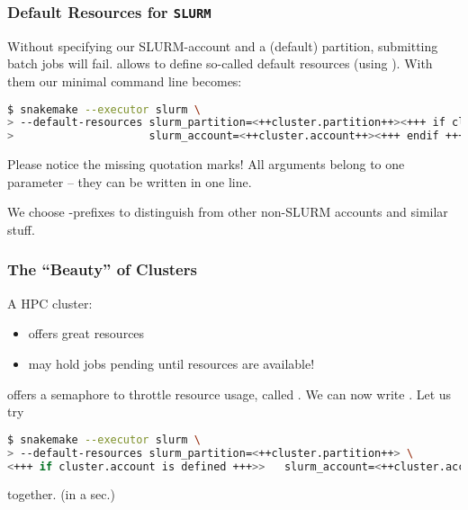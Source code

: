 \begin{frame}[fragile]
  \frametitle{Default Resources for \texttt{SLURM}}
  Without specifying our SLURM-account and a (default) partition, submitting batch jobs will fail. \Snakemake{} allows to define so-called default resources (using ). With them our minimal command line becomes:
  \begin{lstlisting}[language=Bash, style=Shell, basicstyle=\footnotesize]
$ snakemake --executor slurm \
> --default-resources slurm_partition=<++cluster.partition++><+++ if cluster.account is defined +++> \
>                     slurm_account=<++cluster.account++><+++ endif +++>                      
  \end{lstlisting}
  \begin{hint}
  	Please notice the missing quotation marks! All arguments belong to one parameter -- they can be written in one line.
  \end{hint}
  \begin{docs}
  	We choose -prefixes to distinguish from other non-SLURM accounts and similar stuff.
  \end{docs}
\end{frame}

\begin{frame}[fragile]
  \frametitle{The ``Beauty'' of Clusters}
  A HPC cluster:
  \begin{itemize}
   \item offers great resources
   \item may hold jobs pending until resources are available!
  \end{itemize}
  \pause
  \Snakemake{} offers a semaphore to throttle resource usage, called . We can now write . Let us try
  \begin{lstlisting}[language=Bash, style=Shell, basicstyle=\footnotesize]
$ snakemake --executor slurm \
> --default-resources slurm_partition=<++cluster.partition++> \ 
<+++ if cluster.account is defined +++>>   slurm_account=<++cluster.account++><+++ endif +++> -j unlimited
  \end{lstlisting}
  together. (in a sec.)
\end{frame}


